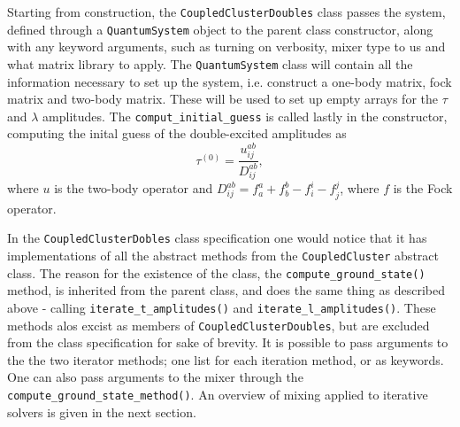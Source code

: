     Starting from construction, the \lstinline{CoupledClusterDoubles} class passes 
    the system, defined through a \lstinline{QuantumSystem} object to the 
    parent class constructor, along with any keyword arguments, such as turning 
    on verbosity, mixer type to us and what matrix library to apply. The
    \lstinline{QuantumSystem} class will contain all the information necessary to 
    set up the system, i.e. construct a one-body matrix, fock matrix and two-body 
    matrix. These will be used to set up empty arrays for the $\tau$ and $\lambda$ 
    amplitudes. The \lstinline{comput_initial_guess} is called lastly in the 
    constructor, computing the inital guess of the double-excited amplitudes as 
    \begin{equation}
        \label{eq:ccd_inital_guess}
        \tau^{(0)} = \frac{u^{ab}_{ij}}{D^{ab}_{ij}},
    \end{equation}
    where $u$ is the two-body operator and
    $D^{ab}_{ij} = f^a_a + f^b_b - f^i_i - f^j_j$,
    where $f$ is the Fock operator.
    
    In the \lstinline{CoupledClusterDobles} class specification one would
    notice that it has implementations of all the abstract methods 
    from the \lstinline{CoupledCluster} abstract class. The reason for the existence 
    of the class, the \lstinline{compute_ground_state()} method, is inherited from the 
    parent class, and does the same thing as described above - calling 
    \lstinline{iterate_t_amplitudes()} and \lstinline{iterate_l_amplitudes()}. These 
    methods alos excist as members of \lstinline{CoupledClusterDoubles}, but are excluded 
    from the class specification for sake of brevity. It is 
    possible to pass arguments to the the two iterator methods; one list for each iteration
    method, or as keywords.
    One can also pass arguments 
    to the mixer through the \lstinline{compute_ground_state_method()}. 
    An overview of mixing applied to iterative solvers is given in the next 
    section.

